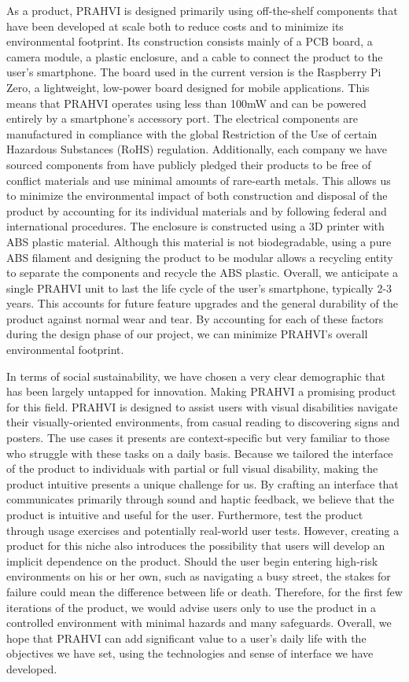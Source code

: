 	As a product, PRAHVI is designed primarily using off-the-shelf components that have been developed at scale both to reduce costs and to minimize its environmental footprint. Its construction consists mainly of a PCB board, a camera module, a plastic enclosure, and a cable to connect the product to the user's smartphone. The board used in the current version is the Raspberry Pi Zero, a lightweight, low-power board designed for mobile applications. This means that PRAHVI operates using less than 100mW and can be powered entirely by a smartphone's accessory port. The electrical components are manufactured in compliance with the global Restriction of the Use of certain Hazardous Substances (RoHS) regulation. Additionally, each company we have sourced components from have publicly pledged their products to be free of conflict materials and use minimal amounts of rare-earth metals. This allows us to minimize the environmental impact of both construction and disposal of the product by accounting for its individual materials and by following federal and international procedures. The enclosure is constructed using a 3D printer with ABS plastic material. Although this material is not biodegradable, using a pure ABS filament and designing the product to be modular allows a recycling entity to separate the components and recycle the ABS plastic. Overall, we anticipate a single PRAHVI unit to last the life cycle of the user's smartphone, typically 2-3 years. This accounts for future feature upgrades and the general durability of the product against normal wear and tear. By accounting for each of these factors during the design phase of our project, we can minimize PRAHVI's overall environmental footprint.
	
	In terms of social sustainability, we have chosen a very clear demographic that has been largely untapped for innovation. Making PRAHVI a promising product for this field. PRAHVI is designed to assist users with visual disabilities navigate their visually-oriented environments, from casual reading to discovering signs and posters. The use cases it presents are context-specific but very familiar to those who struggle with these tasks on a daily basis. Because we tailored the interface of the product to individuals with partial or full visual disability, making the product intuitive presents a unique challenge for us. By crafting an interface that communicates primarily through sound and haptic feedback, we believe that the product is intuitive and useful for the user. Furthermore, test the product through usage exercises and potentially real-world user tests. However, creating a product for this niche also introduces the possibility that users will develop an implicit dependence on the product. Should the user begin entering high-risk environments on his or her own, such as navigating a busy street, the stakes for failure could mean the difference between life or death. Therefore, for the first few iterations of the product, we would advise users only to use the product in a controlled environment with minimal hazards and many safeguards. Overall, we hope that PRAHVI can add significant value to a user's daily life with the objectives we have set, using the technologies and sense of interface we have developed.
	
